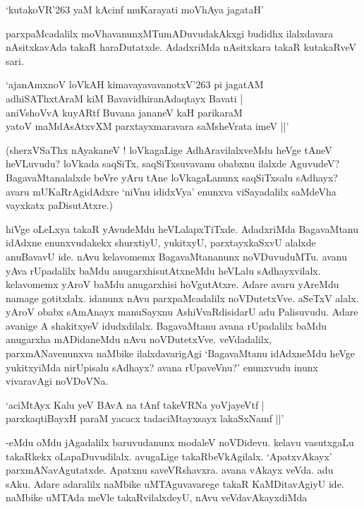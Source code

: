\begin{shloka}
`kutakoVR\char'263 yaM kAcinf muKarayati moVhAya jagataH'
\end{shloka}

parxpaMcadalilx moVhavanunxMTumADuvudakAkxgi budidhx ilalxdavara nAsitxkavAda takaR haraDutatxde. AdadxriMda nAsitxkara takaR kutakaRveV sari.

\begin{shloka}
`ajanAmxnoV loVkAH kimavayavavanotxV\char'263 pi jagatAM\\
adhiSAThxtAraM kiM BavavidhiranAdaqtayx Bavati |\\
aniVshoVvA kuyARtf Buvana jananeV kaH parikaraM\\
yatoV maMdAsAtxvXM parxtayxmaravara saMsheVrata imeV ||'
\end{shloka}

(sherxVSaThx nAyakaneV ! loVkagaLige AdhAravilalxveMdu heVge tAneV heVLuvudu? loVkada saqSiTx, saqSiTxsuvavanu obabxnu ilalxde AguvudeV? BagavaMtanalalxde beVre yAru tAne loVkagaLanunx saqSiTxsalu sAdhayx? avaru mUKaRrAgidAdxre `niVnu ididxVya' enunxva viSayadalilx saMdeVha vayxkatx paDisutAtxre.)

hiVge oLeLxya takaR yAvudeMdu heVLalapxTiTxde. AdadxriMda BagavaMtanu idAdxne enunxvudakekx shurxtiyU, yukitxyU, parxtayxkaSxvU alalxde anuBavavU ide. nAvu kelavomemx BagavaMtananunx noVDuvuduMTu. avanu yAva rUpadalilx baMdu anugarxhisutAtxneMdu heVLalu sAdhayxvilalx. kelavomemx yAroV baMdu anugarxhisi hoVgutAtxre. Adare avaru yAreMdu namage gotitxlalx. idanunx nAvu parxpaMcadalilx noVDutetxVve. aSeTxV alalx. yAroV obabx sAmAnayx manuSayxnu AshiVvaRdisidarU adu Palisuvudu. Adare avanige A shakitxyeV idudxdilalx. BagavaMtanu avana rUpadalilx baMdu anugarxha mADidaneMdu nAvu noVDutetxVve. veVdadalilx, parxmANavenunxva naMbike ilalxdavarigAgi `BagavaMtanu idAdxneMdu heVge yukitxyiMda nirUpisalu sAdhayx? avana rUpaveVnu?' enunxvudu inunx vivaravAgi noVDoVNa.

\begin{shloka}
`aciMtAyx Kalu yeV BAvA na tAnf takeVRNa yoVjayeVtf |\\
parxkaqtiBayxH paraM yacacx tadaciMtayxsayx lakaSxNamf ||'
\end{shloka}

-eMdu oMdu jAgadalilx baruvudanunx modaleV noVDidevu. kelavu vasutxgaLu takaRkekx oLapaDuvudilalx. avugaLige takaRbeVkAgilalx. `ApatxvAkayx' parxmANavAgutatxde. Apatxnu saveVRshavxra. avana vAkayx veVda. adu sAku. Adare adaralilx naMbike uMTAguvavarege takaR KaMDitavAgiyU ide. naMbike uMTAda meVle takaRvilalxdeyU, nAvu veVdavAkayxdiMda

